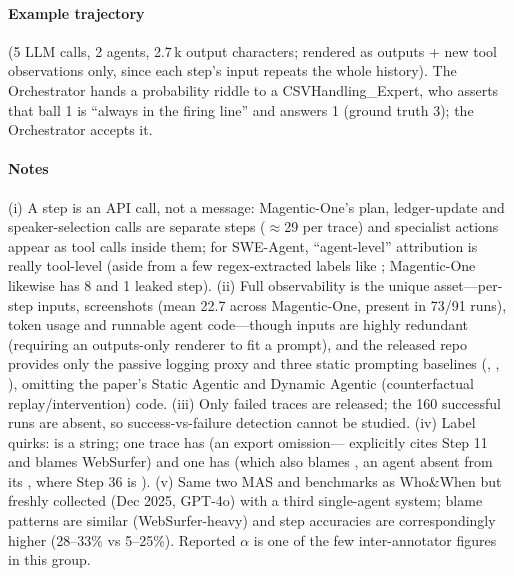\paragraph{Example trajectory}  (5 LLM calls, 2 agents, 2.7\,k output characters; rendered as outputs + new tool observations only, since each step's input repeats the whole history). The Orchestrator hands a probability riddle to a CSVHandling\_Expert, who asserts that ball 1 is ``always in the firing line'' and answers 1 (ground truth 3); the Orchestrator accepts it.


\paragraph{Notes} (i) A step is an API call, not a message: Magentic-One's plan, ledger-update and speaker-selection calls are separate steps ($\approx$29 per trace) and specialist actions appear as tool calls inside them; for SWE-Agent, ``agent-level'' attribution is really tool-level (aside from a few regex-extracted labels like ; Magentic-One likewise has 8  and 1 leaked  step). (ii) Full observability is the unique asset---per-step inputs, screenshots (mean 22.7 across Magentic-One, present in 73/91 runs), token usage and runnable agent code---though inputs are highly redundant (requiring an outputs-only renderer to fit a prompt), and the released repo provides only the passive logging proxy and three static prompting baselines (, , ), omitting the paper's Static Agentic and Dynamic Agentic (counterfactual replay/intervention) code. (iii) Only failed traces are released; the 160 successful runs are absent, so success-vs-failure detection cannot be studied. (iv) Label quirks:  is a string; one trace has  (an export omission--- explicitly cites Step 11 and blames WebSurfer) and one has  (which also blames , an agent absent from its , where Step 36 is ). (v) Same two MAS and benchmarks as Who\&When but freshly collected (Dec 2025, GPT-4o) with a third single-agent system; blame patterns are similar (WebSurfer-heavy) and step accuracies are correspondingly higher (28--33\% vs 5--25\%). Reported $\alpha$ is one of the few inter-annotator figures in this group.
